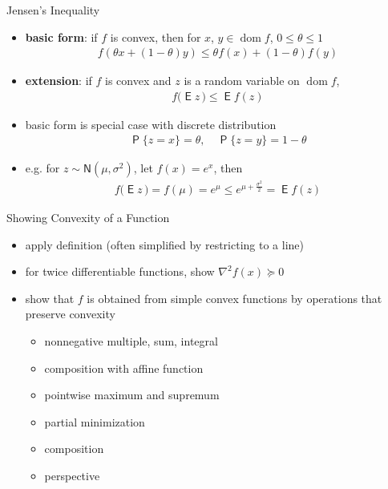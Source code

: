 \documentclass[10pt,handout]{beamer}
\newcommand{\ds}{\displaystyle}
\DeclareMathOperator*{\dom}{dom}
\DeclareMathOperator*\prb{\mathsf{P}}
\DeclareMathOperator*\expc{\mathsf{E}}
\theoremstyle{definition}
\begin{document}
\begin{frame}{Jensen's Inequality}
  \begin{itemize}
    \item {\bf basic form}: if $f$ is convex, then for $x$, $y\in\dom f$, $0\leqslant\theta\leqslant 1$
      \begin{align*}
        f(\theta x + (1 - \theta) y) \leqslant \theta f(x) + (1 - \theta) f(y)
      \end{align*}
    \item {\bf extension}: if $f$ is convex and $z$ is a random variable on $\dom f$,
      \begin{align*}
        f\big(\expc{z}\,\big) \leqslant \expc{f(z)}
      \end{align*}
    \item basic form is special case with discrete distribution
      \begin{align*}
        \prb\{z = x\} = \theta,\quad\prb\{z = y\} = 1 - \theta
      \end{align*}
    \item e.g. for $\ds z\sim\mathsf{N}(\mu,\sigma^2)$, let $\ds f(x) = e^x$, then
      \begin{align*}
        f\big(\expc{z}\,\big) = f(\mu) = e^{\mu}\leqslant e^{\mu + \frac{\sigma^2}{2}} = \expc{f(z)}
      \end{align*}
  \end{itemize}
\end{frame}

\begin{frame}{Showing Convexity of a Function}
  \begin{itemize}
    \item apply definition (often simplified by restricting to a line)
    \item for twice differentiable functions, show $\ds\nabla^2 f(x)\succcurlyeq 0$
    \item show that $f$ is obtained from simple convex functions by operations that preserve convexity
      \begin{itemize}
        \item nonnegative multiple, sum, integral
        \item composition with affine function
        \item pointwise maximum and supremum
        \item partial minimization
        \item composition
        \item perspective
      \end{itemize}
  \end{itemize}
\end{frame}
\end{document}
